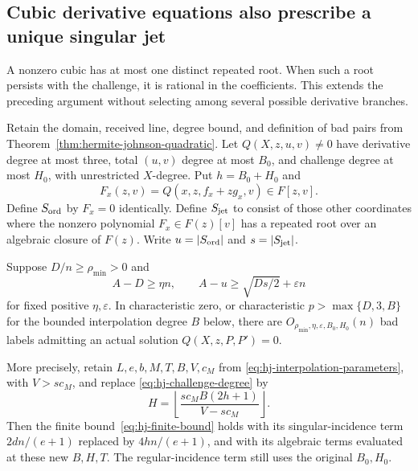 \subsection{Cubic derivative equations also prescribe a unique singular jet}
\label{sec:hermite-johnson-cubic}

A nonzero cubic has at most one distinct repeated root.  When such a
root persists with the challenge, it is rational in the coefficients.
This extends the preceding argument without selecting among several
possible derivative branches.

\begin{corollary}
\label{cor:hermite-johnson-cubic}
Retain the domain, received line, degree bound, and definition of bad
pairs from Theorem~\ref{thm:hermite-johnson-quadratic}.  Let
$Q(X,z,u,v)\ne0$ have derivative degree at most three, total $(u,v)$
degree at most $B_0$, and challenge degree at most $H_0$, with unrestricted
$X$-degree.  Put $h=B_0+H_0$ and
\[
 F_x(z,v)=Q(x,z,f_x+zg_x,v)\in F[z,v].
\]
Define $S_{\rm ord}$ by $F_x=0$ identically.  Define $S_{\rm jet}$
to consist of those other coordinates where the nonzero polynomial
$F_x\in F(z)[v]$ has a repeated root over an algebraic closure of
$F(z)$.  Write $u=|S_{\rm ord}|$ and $s=|S_{\rm jet}|$.

Suppose $D/n\ge\rho_{\min}>0$ and
\[
 A-D\ge\eta n,\qquad
 A-u\ge\sqrt{Ds/2}+\varepsilon n
\]
for fixed positive $\eta,\varepsilon$.  In characteristic zero, or
characteristic $p>\max\{D,3,B\}$ for the bounded interpolation degree
$B$ below, there are
$O_{\rho_{\min},\eta,\varepsilon,B_0,H_0}(n)$ bad labels admitting
an actual solution $Q(X,z,P,P')=0$.

More precisely, retain $L,e,b,M,T,B,V,c_M$ from
\eqref{eq:hj-interpolation-parameters}, with $V>sc_M$, and replace
\eqref{eq:hj-challenge-degree} by
\begin{equation}
 H=\left\lfloor\frac{sc_MB(2h+1)}{V-sc_M}\right\rfloor.
 \label{eq:hj-cubic-challenge-degree}
\end{equation}
Then the finite bound~\eqref{eq:hj-finite-bound} holds with its
singular-incidence term $2dn/(e+1)$ replaced by $4hn/(e+1)$,
and with its algebraic terms evaluated at these new $B,H,T$.
The regular-incidence term still uses the original $B_0,H_0$.
\end{corollary}


